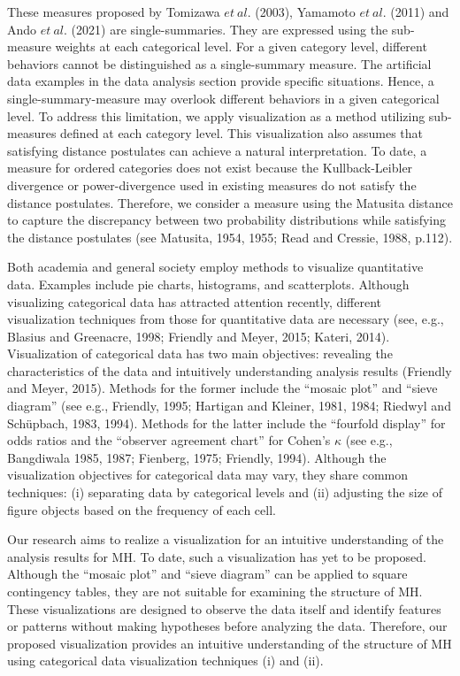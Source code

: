 \documentclass[a4j,12pt]{article}
\begin{document}
These measures proposed by Tomizawa $et~al.$ (2003), Yamamoto $et~al.$ (2011) and Ando $et~al.$ (2021) are single-summaries.
They are expressed using the sub-measure weights at each categorical level. 
For a given category level, different behaviors cannot be distinguished as a single-summary measure. 
The artificial data examples in the data analysis section provide specific situations. 
Hence, a single-summary-measure may overlook different behaviors in a given categorical level.
To address this limitation, we apply visualization as a method utilizing sub-measures defined at each category level. 
This visualization also assumes that satisfying distance postulates can achieve a natural interpretation. 
To date, a measure for ordered categories does not exist because the Kullback-Leibler divergence or power-divergence used in existing measures do not satisfy the distance postulates. 
Therefore, we consider a measure using the Matusita distance to capture the discrepancy between two probability distributions while satisfying the distance postulates (see Matusita, 1954, 1955; Read and Cressie, 1988, p.112).

Both academia and general society employ methods to visualize quantitative data. 
Examples include pie charts, histograms, and scatterplots. 
Although visualizing categorical data has attracted attention recently, different visualization techniques from those for quantitative data are necessary (see, e.g., Blasius and Greenacre, 1998; Friendly and Meyer, 2015; Kateri, 2014).
Visualization of categorical data has two main objectives: revealing the characteristics of the data and intuitively understanding analysis results (Friendly and Meyer, 2015). 
Methods for the former include the ``mosaic plot'' and ``sieve diagram'' (see e.g., Friendly, 1995; Hartigan and Kleiner, 1981, 1984; Riedwyl and Sch\"{u}pbach, 1983, 1994).
Methods for the latter include the ``fourfold display'' for odds ratios and the  ``observer agreement chart'' for Cohen’s $\kappa$ (see e.g., Bangdiwala 1985, 1987; Fienberg, 1975; Friendly, 1994). 
Although the visualization objectives for categorical data may vary, they share common techniques: (i) separating data by categorical levels and (ii) adjusting the size of figure objects based on the frequency of each cell.

Our research aims to realize a visualization for an intuitive understanding of the analysis results for MH. 
To date, such a visualization has yet to be proposed. 
Although the ``mosaic plot'' and ``sieve diagram'' can be applied to square contingency tables, they are not suitable for examining the structure of MH. 
These visualizations are designed to observe the data itself and identify features or patterns without making hypotheses before analyzing the data. 
Therefore, our proposed visualization provides an intuitive understanding of the structure of MH using categorical data visualization techniques (i) and (ii).
\end{document}
